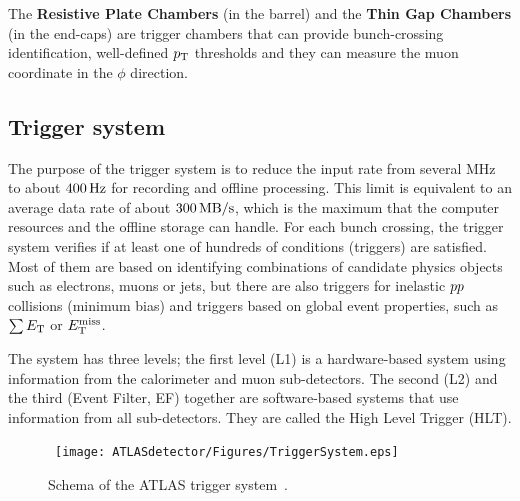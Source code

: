 The {\bf Resistive Plate Chambers} (in the barrel) and the {\bf Thin Gap Chambers} (in the end-caps) are trigger chambers that can provide bunch-crossing identification, well-defined $p_{\mathrm{T}}$ thresholds and they can measure the muon coordinate in the $\phi$ direction.


\subsection{Trigger system}
    \label{subsec:TriggerSystem}

The purpose of the trigger system is to reduce the input rate from several MHz to about $\unit[400]{Hz}$ for recording and offline processing.
This limit is equivalent to an average data rate of about $\unit[300]{MB/s}$, which is the maximum that the computer resources and the offline storage can handle.
For each bunch crossing, the trigger system verifies if at least one of hundreds of conditions (triggers) are satisfied.
Most of them are based on identifying combinations of candidate physics objects such as electrons, muons or jets, but there are also triggers for inelastic $pp$ collisions (minimum bias) and triggers based on global event properties, such as $\sum E_{\mathrm{T}}$ or $E_{\mathrm{T}}^{\mathrm{miss}}$.

The system has three levels; the first level (L1) is a hardware-based system using information from the calorimeter and muon sub-detectors. 
The second (L2) and the third (Event Filter, EF) together are software-based systems that use information from all sub-detectors. 
They are called the High Level Trigger (HLT).

\begin{figure}[!ht]
  \begin{center}
    \mbox{
      \texttt{[image: ATLASdetector/Figures/TriggerSystem.eps]}
    }
  \end{center}
  \caption[Schema of the ATLAS trigger system.]{Schema of the ATLAS trigger system~\protect\cite{Aad:2012xs}.}
  \label{fig:TriggerSchema}
\end{figure}

